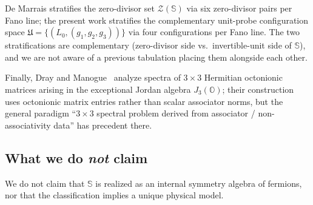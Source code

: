 \documentclass[12pt,a4paper]{article}
\begin{document}
De Marrais stratifies the zero-divisor set $\mathcal{Z}(\mathbb{S})$ via six zero-divisor pairs per Fano line; the present work stratifies the complementary unit-probe configuration space $\mathfrak{U} = \{(L_0, (g_1, g_2, g_3))\}$ via four configurations per Fano line. The two stratifications are complementary (zero-divisor side vs.\ invertible-unit side of $\mathbb{S}$), and we are not aware of a previous tabulation placing them alongside each other.

Finally, Dray and Manogue~\cite{dray_manogue1998} analyze spectra of $3 \times 3$ Hermitian octonionic matrices arising in the exceptional Jordan algebra $J_3(\mathbb{O})$; their construction uses octonionic matrix entries rather than scalar associator norms, but the general paradigm ``$3 \times 3$ spectral problem derived from associator / non-associativity data'' has precedent there.

\subsection{What we do \emph{not} claim}\label{sec:nonclaims}
We do not claim that $\mathbb{S}$ is realized as an internal symmetry algebra of fermions, nor that the classification implies a unique physical model.
\end{document}

